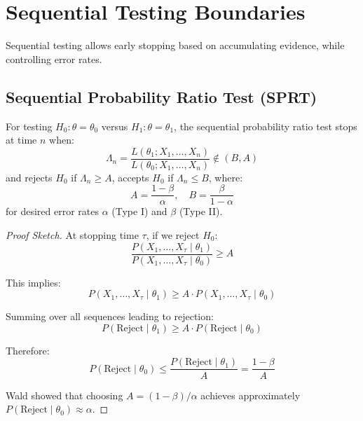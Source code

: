 \section{Sequential Testing Boundaries}

Sequential testing allows early stopping based on accumulating evidence, while controlling error rates.

\subsection{Sequential Probability Ratio Test (SPRT)}

\begin{theorem}
For testing $H_0: \theta = \theta_0$ versus $H_1: \theta = \theta_1$, the sequential probability ratio test stops at time $n$ when:
\begin{equation}
\Lambda_n = \frac{L(\theta_1; X_1, \ldots, X_n)}{L(\theta_0; X_1, \ldots, X_n)} \notin (B, A)
\end{equation}
and rejects $H_0$ if $\Lambda_n \geq A$, accepts $H_0$ if $\Lambda_n \leq B$, where:
\begin{equation}
A = \frac{1-\beta}{\alpha}, \quad B = \frac{\beta}{1-\alpha}
\end{equation}
for desired error rates $\alpha$ (Type I) and $\beta$ (Type II).
\end{theorem}

\begin{proof}[Proof Sketch]
At stopping time $\tau$, if we reject $H_0$:
\begin{equation}
\frac{P(X_1, \ldots, X_\tau \mid \theta_1)}{P(X_1, \ldots, X_\tau \mid \theta_0)} \geq A
\end{equation}

This implies:
\begin{equation}
P(X_1, \ldots, X_\tau \mid \theta_1) \geq A \cdot P(X_1, \ldots, X_\tau \mid \theta_0)
\end{equation}

Summing over all sequences leading to rejection:
\begin{equation}
P(\text{Reject} \mid \theta_1) \geq A \cdot P(\text{Reject} \mid \theta_0)
\end{equation}

Therefore:
\begin{equation}
P(\text{Reject} \mid \theta_0) \leq \frac{P(\text{Reject} \mid \theta_1)}{A} = \frac{1-\beta}{A}
\end{equation}

Wald showed that choosing $A = (1-\beta)/\alpha$ achieves approximately $P(\text{Reject} \mid \theta_0) \approx \alpha$.
\end{proof}

